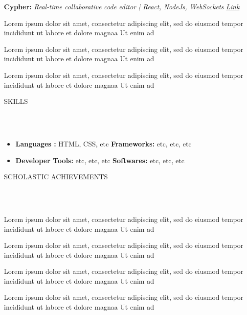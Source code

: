 \documentclass[letterpaper,10pt]{article}
\newcommand{\header}[1]{{
\hspace*{0pt}\vspace*{6pt} \textsc{#1}} \vspace*{-6pt} 
\lineunder
}
\newcommand{\lineunder}{
\vspace*{-8pt} \\ \hspace*{-3pt} 
\hrulefill \\
}
\newcommand{\project}[3]{{
\vspace*{2pt} 
\textbf{#1} \textit{#2} \hfill \textit{#3} \\ }
}
\renewcommand{\labelitemii}{
$\vcenter{\hbox{\tiny$\bullet$}}$\hspace*{-3pt}
}
\newenvironment{bullet-list-minor}{
\begin{list}{\labelitemii}{\setlength\leftmargin{15pt} 
\topsep 0pt \itemsep -2pt}}{\vspace*{4pt}\end{list}
}
\begin{document}
    \project{Cypher:}{Real-time collaborative code editor | React, NodeJs, WebSockets }{\href{https://4vinn.netlify.app}{Link}}
    \begin{bullet-list-minor}
    \item Lorem ipsum dolor sit amet, consectetur adipiscing elit, sed do eiusmod tempor incididunt ut labore et dolore magnaa Ut enim ad
    \item Lorem ipsum dolor sit amet, consectetur adipiscing elit, sed do eiusmod tempor incididunt ut labore et dolore magnaa Ut enim ad
    \item Lorem ipsum dolor sit amet, consectetur adipiscing elit, sed do eiusmod tempor incididunt ut labore et dolore magnaa Ut enim ad
    \end{bullet-list-minor} 
    
\vspace*{4pt}%
\header{SKILLS}
\vspace{-4.2pt}
\begin{itemize}[left= 0.1cm]
    \small
    \item \textbf{Languages :} HTML, CSS, etc \hspace{1cm} \textbf{Frameworks:} etc, etc, etc
    \item \textbf{Developer Tools:} etc, etc, etc \hspace{0.9cm}
        \textbf{Softwares:} etc, etc, etc        
\end{itemize}

\vspace*{4pt}%
\header{SCHOLASTIC ACHIEVEMENTS}
\begin{bullet-list-minor}
        \item Lorem ipsum dolor sit amet, consectetur adipiscing elit, sed do eiusmod tempor incididunt ut labore et dolore magnaa Ut enim ad
        \item Lorem ipsum dolor sit amet, consectetur adipiscing elit, sed do eiusmod tempor incididunt ut labore et dolore magnaa Ut enim ad
        \item Lorem ipsum dolor sit amet, consectetur adipiscing elit, sed do eiusmod tempor incididunt ut labore et dolore magnaa Ut enim ad
        \item Lorem ipsum dolor sit amet, consectetur adipiscing elit, sed do eiusmod tempor incididunt ut labore et dolore magnaa Ut enim ad
	   
\end{bullet-list-minor}
\end{document}
